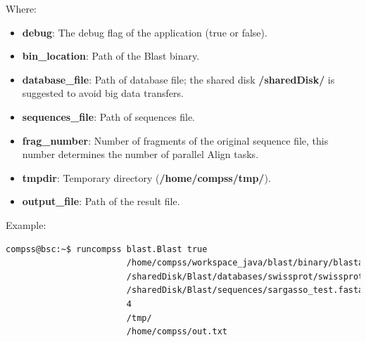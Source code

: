 Where:
\begin{itemize}
 \item {\bf debug}: The debug flag of the application (true or false).
 \item {\bf bin\_location}: Path of the Blast binary.
 \item {\bf database\_file}: Path of database file; the shared disk {\bf /sharedDisk/} is suggested to avoid big data transfers.
 \item {\bf sequences\_file}: Path of sequences file.
 \item {\bf frag\_number}: Number of fragments of the original sequence file, this number determines the number of parallel Align tasks.
 \item {\bf tmpdir}: Temporary directory ({\bf /home/compss/tmp/}).
 \item {\bf output\_file}: Path of the result file.
\end{itemize}
 
Example:
\begin{lstlisting}[language=bash]
compss@bsc:~$ runcompss blast.Blast true
                        /home/compss/workspace_java/blast/binary/blastall
                        /sharedDisk/Blast/databases/swissprot/swissprot
                        /sharedDisk/Blast/sequences/sargasso_test.fasta 
                        4 
                        /tmp/
                        /home/compss/out.txt
\end{lstlisting}